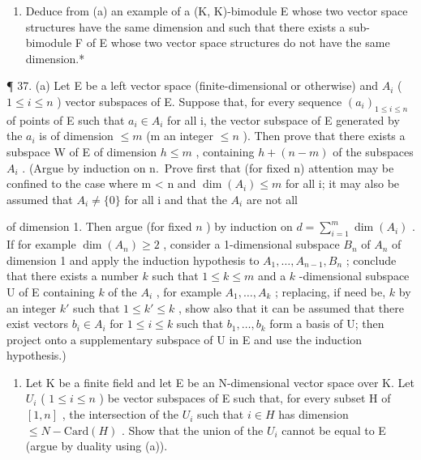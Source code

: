 \begin{enumerate}
\def\labelenumi{(\alph{enumi})}
\setcounter{enumi}{1}
\tightlist
\item
  Deduce from (a) an example of a (K, K)-bimodule E whose two vector space structures have the same dimension and such that there exists a sub-bimodule F of E whose two vector space structures do not have the same dimension.*
\end{enumerate}

¶ 37. (a) Let E be a left vector space (finite-dimensional or otherwise) and \(A_{i}\) ( \(1 \leqslant i \leqslant n\) ) vector subspaces of E. Suppose that, for every sequence \((a_{i})_{1 \leqslant i \leqslant n}\) of points of E such that \(a_{i} \in A_{i}\) for all i, the vector subspace of E generated by the \(a_{i}\) is of dimension \(\leqslant m\) (m an integer \(\leqslant n\) ). Then prove that there exists a subspace W of E of dimension \(h \leqslant m\) , containing \(h + (n - m)\) of the subspaces \(A_{i}\) . (Argue by induction on n.~Prove first that (for fixed n) attention may be confined to the case where m \textless{} n and \(\dim(A_{i}) \leqslant m\) for all i; it may also be assumed that \(A_{i} \neq \{0\}\) for all i and that the \(A_{i}\) are not all

of dimension 1. Then argue (for fixed \(n\) ) by induction on \(d = \sum_{i=1}^{m} \dim(A_i)\) . If for example \(\dim(A_n) \geqslant 2\) , consider a 1-dimensional subspace \(B_n\) of \(A_n\) of dimension 1 and apply the induction hypothesis to \(A_1, \ldots, A_{n-1}, B_n\) ; conclude that there exists a number \(k\) such that \(1 \leqslant k \leqslant m\) and a \(k\) -dimensional subspace U of E containing \(k\) of the \(A_i\) , for example \(A_1, \ldots, A_k\) ; replacing, if need be, \(k\) by an integer \(k'\) such that \(1 \leqslant k' \leqslant k\) , show also that it can be assumed that there exist vectors \(b_i \in A_i\) for \(1 \leqslant i \leqslant k\) such that \(b_1, \ldots, b_k\) form a basis of U; then project onto a supplementary subspace of U in E and use the induction hypothesis.)

\begin{enumerate}
\def\labelenumi{(\alph{enumi})}
\setcounter{enumi}{1}
\tightlist
\item
  Let K be a finite field and let E be an N-dimensional vector space over K. Let \(U_{i}\) ( \(1 \leqslant i \leqslant n\) ) be vector subspaces of E such that, for every subset H of \([1, n]\) , the intersection of the \(U_{i}\) such that \(i \in H\) has dimension \(\leqslant N - \text{Card}(H)\) . Show that the union of the \(U_{i}\) cannot be equal to E (argue by duality using (a)).
\end{enumerate}

